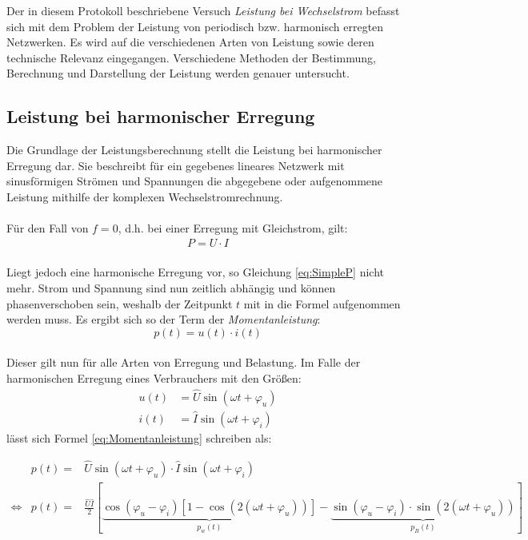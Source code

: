 
Der in diesem Protokoll beschriebene Versuch \textit{Leistung bei Wechselstrom} befasst sich mit dem Problem der Leistung von periodisch bzw. harmonisch erregten Netzwerken. Es wird auf die verschiedenen Arten von Leistung sowie deren technische Relevanz eingegangen. Verschiedene Methoden der Bestimmung, Berechnung und Darstellung der Leistung werden genauer untersucht.

\subsection{Leistung bei harmonischer Erregung}

Die Grundlage der Leistungsberechnung stellt die Leistung bei harmonischer Erregung dar. Sie beschreibt für ein gegebenes lineares Netzwerk mit sinusförmigen Strömen und Spannungen die abgegebene oder aufgenommene Leistung mithilfe der komplexen Wechselstromrechnung.\\
\\
Für den Fall von $f=0$, d.h. bei einer Erregung mit Gleichstrom, gilt:
\begin{align}
P=U\cdot I \label{eq:SimpleP}
\end{align}
\\
Liegt jedoch eine harmonische Erregung vor, so Gleichung \eqref{eq:SimpleP} nicht mehr. Strom und Spannung sind nun zeitlich abhängig und können phasenverschoben sein, weshalb der Zeitpunkt $t$ mit in die Formel aufgenommen werden muss. Es ergibt sich so der Term der \textit{Momentanleistung}:
\begin{equation} \label{eq:Momentanleistung}
p(t)=u(t)\cdot i(t)
\end{equation}
\\
Dieser gilt nun für alle Arten von Erregung und Belastung. Im Falle der harmonischen Erregung eines Verbrauchers mit den Größen:
\begin{align}
u(t) &= \hat{U}\sin(\omega t + \varphi_u)\\
i(t) &= \hat{I}\sin(\omega t + \varphi_i)
\end{align}
lässt sich Formel \eqref{eq:Momentanleistung} schreiben als:
\begin{small}
\begin{eqnarray}
&p(t)=&\hat{U}\sin(\omega t + \varphi_u) \cdot \hat{I}\sin(\omega t + \varphi_i) \\
\Leftrightarrow & p(t) =&\frac{\hat{U}\hat{I}}{2}\left[\underbrace{\cos(\varphi_u-\varphi_i)[1-\cos(2(\omega t + \varphi_u))]}_{p_w(t)}-\underbrace{\sin(\varphi_u-\varphi_i)\cdot\sin(2(\omega t + \varphi_u))}_{p_B(t)}\right] \label{eq:MomLeistungSplit}
\end{eqnarray}
\end{small}


